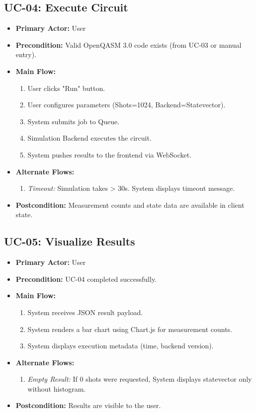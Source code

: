 \subsection{UC-04: Execute Circuit}
\begin{itemize}
    \item \textbf{Primary Actor:} User
    \item \textbf{Precondition:} Valid OpenQASM 3.0 code exists (from UC-03 or manual entry).
    \item \textbf{Main Flow:}
    \begin{enumerate}
        \item User clicks "Run" button.
        \item User configures parameters (Shots=1024, Backend=Statevector).
        \item System submits job to Queue.
        \item Simulation Backend executes the circuit.
        \item System pushes results to the frontend via WebSocket.
    \end{enumerate}
    \item \textbf{Alternate Flows:}
    \begin{enumerate}
        \item [4a] \textit{Timeout:} Simulation takes > 30s. System displays timeout message.
    \end{enumerate}
    \item \textbf{Postcondition:} Measurement counts and state data are available in client state.
\end{itemize}

\subsection{UC-05: Visualize Results}
\begin{itemize}
    \item \textbf{Primary Actor:} User
    \item \textbf{Precondition:} UC-04 completed successfully.
    \item \textbf{Main Flow:}
    \begin{enumerate}
        \item System receives JSON result payload.
        \item System renders a bar chart using Chart.js for measurement counts.
        \item System displays execution metadata (time, backend version).
    \end{enumerate}
    \item \textbf{Alternate Flows:}
    \begin{enumerate}
        \item [2a] \textit{Empty Result:} If 0 shots were requested, System displays statevector only without histogram.
    \end{enumerate}
    \item \textbf{Postcondition:} Results are visible to the user.
\end{itemize}

